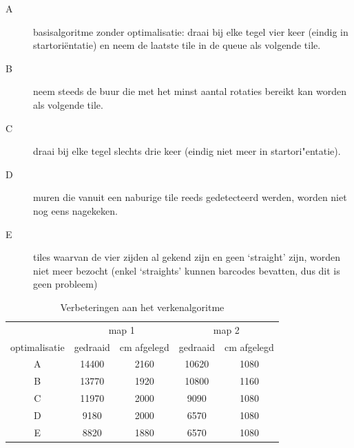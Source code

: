 \documentclass[tt1]{penoverslag}
\begin{document}
\begin{description}
\item[A] basisalgoritme zonder optimalisatie: draai bij elke tegel vier keer (eindig in startori\"entatie) en neem de laatste tile in de queue als volgende tile.
\item[B] neem steeds de buur die met het minst aantal rotaties bereikt kan worden als volgende tile.
\item[C] draai bij elke tegel slechts drie keer (eindig niet meer in startori"entatie).
\item[D] muren die vanuit een naburige tile reeds gedetecteerd werden, worden niet nog eens nagekeken.
\item[E] tiles waarvan de vier zijden al gekend zijn en geen `straight' zijn, worden niet meer bezocht (enkel `straights' kunnen barcodes bevatten, dus dit is geen probleem)
\end{description}

\begin{table}[!hb]
\begin{center}
    \begin{tabular}{ c ||  c | c | c | c }
     & \multicolumn{2}{|c|}{map 1}& \multicolumn{2}{|c}{map 2} \\
    optimalisatie & gedraaid & cm afgelegd & gedraaid & cm afgelegd\\ \hline \hline
    A & 14400 & 2160 & 10620 & 1080 \\ \hline
    B & 13770 & 1920 & 10800 & 1160 \\ \hline
    C & 11970 & 2000 & 9090 & 1080 \\ \hline
    D & 9180 & 2000 & 6570 & 1080\\ \hline
    E & 8820 & 1880 & 6570 & 1080\\
    \end{tabular}
    \caption{Verbeteringen aan het verkenalgoritme}
    \label{tab:resultVerken}
\end{center}
\end{table}
\end{document}
